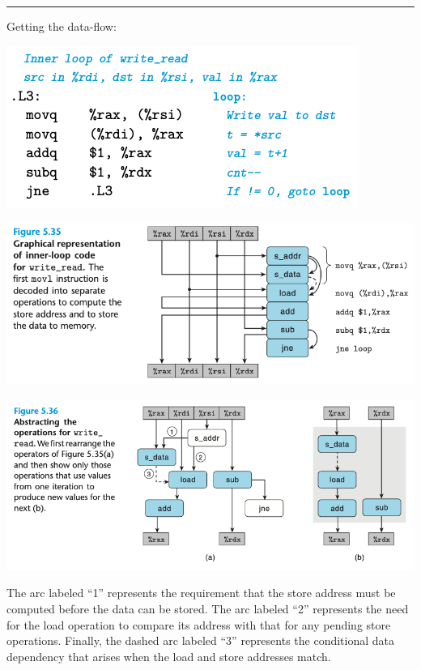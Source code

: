 \documentclass[11pt]{article}
\begin{document}
\noindent\rule{\textwidth}{0.5pt}
Getting the data-flow:\\

\begin{center}
\includegraphics[width=.9\linewidth]{pics/read-write-assembly-code.png}
\end{center}

\begin{center}
\includegraphics[width=.9\linewidth]{pics/figure5.35-graphical-reprensentation-of-inner-loop-for-write-read.png}
\end{center}

\begin{center}
\includegraphics[width=.9\linewidth]{pics/figure5.36-abstrating-the-operations-for-write-read.png}
\end{center}

The arc labeled “1” represents the requirement that the store address must be computed before the data can be stored. The arc labeled “2” represents the need for the load operation to compare its address with that for any pending store operations. Finally, the dashed arc labeled “3” represents the conditional data dependency that arises when the load and store addresses match.\\
\end{document}
